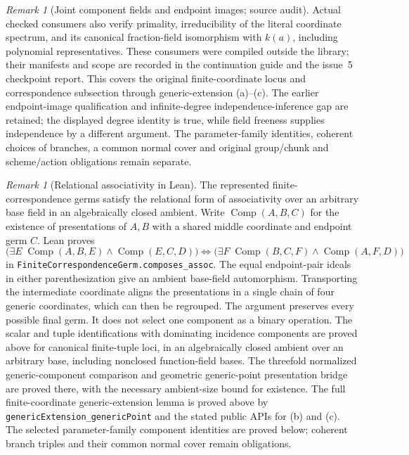 \documentclass[11pt,oneside]{article}
\theoremstyle{definition}
\theoremstyle{remark}
\newtheorem{remark}[theorem]{Remark}
\newcommand{\lean}[1]{\nolinkurl{#1}}
\begin{document}
\begin{remark}[Joint component fields and endpoint images; source audit]
Actual checked consumers also verify primality, irreducibility of the
literal coordinate spectrum, and its canonical fraction-field
isomorphism with $k(a)$, including polynomial representatives.
These consumers were compiled outside the library; their manifests and
scope are recorded in the continuation guide and the issue~5 checkpoint report.
This covers the original finite-coordinate locus and correspondence
subsection through generic-extension (a)--(c). The earlier endpoint-image
qualification and infinite-degree independence-inference gap are retained;
the displayed degree identity is true, while field freeness supplies
independence by a different argument. The parameter-family identities,
coherent choices of branches, a common normal cover and original
group/chunk and scheme/action obligations remain separate.
\end{remark}

\begin{remark}[Relational associativity in Lean]
The represented finite-correspondence germs satisfy the relational form of
associativity over an arbitrary base field in an algebraically closed ambient.
Write $\operatorname{Comp}(A,B,C)$ for the existence of presentations of $A,B$
with a shared middle coordinate and endpoint germ $C$.  Lean proves
\[
 \bigl(\exists E\;\operatorname{Comp}(A,B,E)\land\operatorname{Comp}(E,C,D)\bigr)
 \Longleftrightarrow
 \bigl(\exists F\;\operatorname{Comp}(B,C,F)\land\operatorname{Comp}(A,F,D)\bigr)
\]
in \lean{FiniteCorrespondenceGerm.composes_assoc}.
The equal endpoint-pair ideals in either parenthesization give an ambient
base-field automorphism.  Transporting the intermediate coordinate aligns
the presentations in a single chain of four generic coordinates, which can
then be regrouped.  The argument preserves every possible final germ.
It does not select one component as a binary operation.  The scalar and tuple identifications with dominating incidence components
are proved above for canonical finite-tuple loci, in an algebraically closed
ambient over an arbitrary base, including nonclosed function-field bases.
The threefold normalized generic-component comparison and geometric
generic-point presentation bridge are proved there, with the necessary
ambient-size bound for existence. The full finite-coordinate generic-extension
lemma is proved above by \lean{genericExtension_genericPoint} and the
stated public APIs for (b) and (c). The selected parameter-family component identities are proved below;
coherent branch triples and their common normal cover remain obligations.
\end{remark}
\end{document}
